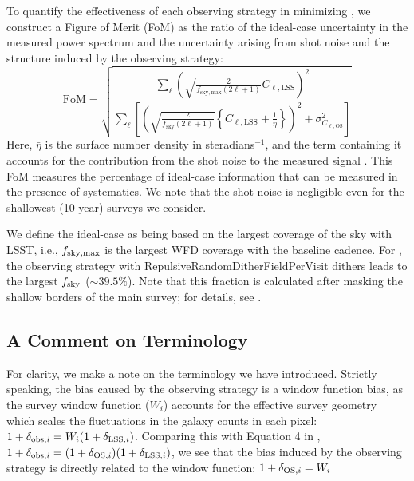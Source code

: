 To quantify the effectiveness of each observing strategy in minimizing \sigmaOS, we construct a Figure of Merit (FoM) as the ratio of the ideal-case uncertainty in the measured power spectrum and the uncertainty arising from shot noise and the structure induced by the observing strategy:
\begin{equation}
	\mathrm{FoM} = \sqrt{\frac{\sum\limits_\ell{\left({\sqrt{\frac{2}{f_{\mathrm{sky, max}} (2\ell + 1)}}C_{\ell, \mathrm{LSS}}} \right)}^2}{\sum\limits_\ell \left[{ \left( { \sqrt{\frac{2}{f_{\mathrm{sky}} (2\ell + 1)}}\left\{{C_{\ell, \mathrm{LSS}} + \frac{1}{\bar{\eta}}} \right\}  } \right ) ^2 + \sigma_{C_{\ell,\mathrm{OS}}}^2  }\right]}}
\label{eq: FoM}
\end{equation}
Here, $\bar{\eta}$ is the surface number density in steradians$^{-1}$, and the term containing it accounts for the contribution from the shot noise to the measured signal \citep{HutererEtal2001,Jing2005}. This FoM measures the percentage of ideal-case information that can be measured in the presence of systematics. We note that the shot noise is negligible even for the shallowest (10-year) surveys we consider.

We define the ideal-case as being based on the largest coverage of the sky with LSST, i.e., $f_{\rm{sky, max}}$ is the largest WFD coverage with the baseline cadence. For , the observing strategy with RepulsiveRandomDitherFieldPerVisit dithers leads to the largest $f_{\rm{sky}}$ ($\sim 39.5\%$). Note that this fraction is calculated after masking the shallow borders of the main survey; for details, see \citet{AwanEtal2016}. %

\subsection{A Comment on Terminology}
For clarity, we make a note on the terminology we have introduced. Strictly speaking, the bias caused by the observing strategy is a window function bias, as the survey window function ($W_i$) accounts for the effective survey geometry which scales the fluctuations in the galaxy counts in each pixel: $1+\delta_{\mathrm{obs},i}= W_i(1+\delta_{\mathrm{LSS},i})$. Comparing this with Equation 4 in \citet{AwanEtal2016}, $1+\delta_{\mathrm{obs},i}= (1+\delta_{\mathrm{OS},i})(1+\delta_{\mathrm{LSS},i})$, we see that the bias induced by the observing strategy is directly related to the window function: $1 + \delta_{\mathrm{OS},i}= W_i$

